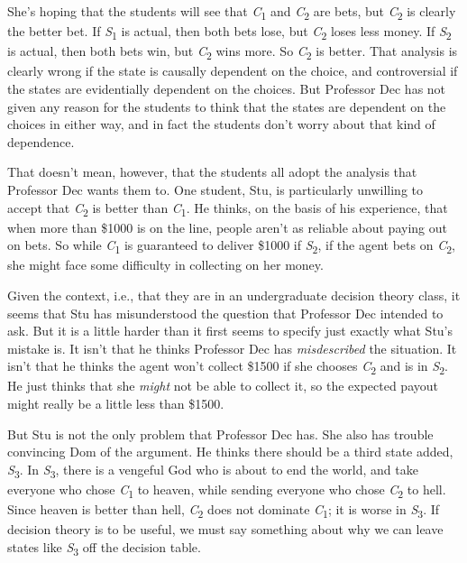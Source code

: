 \documentclass[
  10pt,
  letterpaper,
  DIV=11,
  numbers=noendperiod,
  twoside]{scrartcl}
\begin{document}
She's hoping that the students will see that \emph{C}\textsubscript{1}
and \emph{C}\textsubscript{2} are bets, but \emph{C}\textsubscript{2} is
clearly the better bet. If \emph{S}\textsubscript{1} is actual, then
both bets lose, but \emph{C}\textsubscript{2} loses less money. If
\emph{S}\textsubscript{2} is actual, then both bets win, but
\emph{C}\textsubscript{2} wins more. So \emph{C}\textsubscript{2} is
better. That analysis is clearly wrong if the state is causally
dependent on the choice, and controversial if the states are
evidentially dependent on the choices. But Professor Dec has not given
any reason for the students to think that the states are dependent on
the choices in either way, and in fact the students don't worry about
that kind of dependence.

That doesn't mean, however, that the students all adopt the analysis
that Professor Dec wants them to. One student, Stu, is particularly
unwilling to accept that \emph{C}\textsubscript{2} is better than
\emph{C}\textsubscript{1}. He thinks, on the basis of his experience,
that when more than \$1000 is on the line, people aren't as reliable
about paying out on bets. So while \emph{C}\textsubscript{1} is
guaranteed to deliver \$1000 if \emph{S}\textsubscript{2}, if the agent
bets on \emph{C}\textsubscript{2}, she might face some difficulty in
collecting on her money.

Given the context, i.e., that they are in an undergraduate decision
theory class, it seems that Stu has misunderstood the question that
Professor Dec intended to ask. But it is a little harder than it first
seems to specify just exactly what Stu's mistake is. It isn't that he
thinks Professor Dec has \emph{misdescribed} the situation. It isn't
that he thinks the agent won't collect \$1500 if she chooses
\emph{C}\textsubscript{2} and is in \emph{S}\textsubscript{2}. He just
thinks that she \emph{might} not be able to collect it, so the expected
payout might really be a little less than \$1500.

But Stu is not the only problem that Professor Dec has. She also has
trouble convincing Dom of the argument. He thinks there should be a
third state added, \emph{S}\textsubscript{3}. In
\emph{S}\textsubscript{3}, there is a vengeful God who is about to end
the world, and take everyone who chose \emph{C}\textsubscript{1} to
heaven, while sending everyone who chose \emph{C}\textsubscript{2} to
hell. Since heaven is better than hell, \emph{C}\textsubscript{2} does
not dominate \emph{C}\textsubscript{1}; it is worse in
\emph{S}\textsubscript{3}. If decision theory is to be useful, we must
say something about why we can leave states like
\emph{S}\textsubscript{3} off the decision table.
\end{document}
